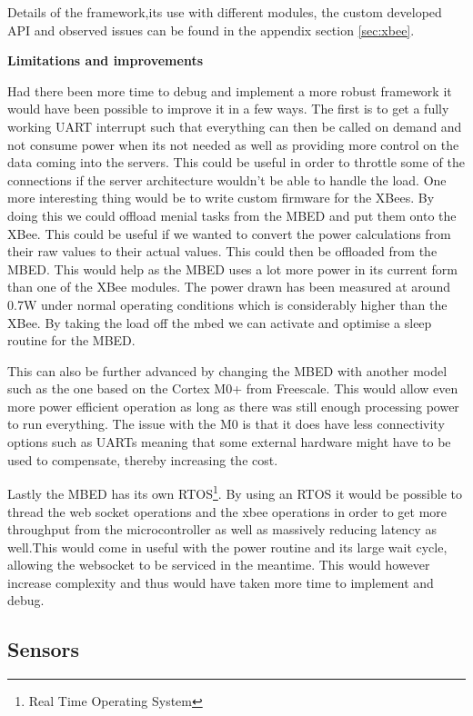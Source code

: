 \documentclass[10.5pt,a4paper,twoside]{report}   %
\begin{document}
Details of the framework,its use with different modules, the custom developed API and observed issues can be found in the appendix section \ref{sec:xbee}.

\textbf{Limitations and improvements}

Had there been more time to debug and implement a more robust framework it would have been possible to improve it in a few ways. The first is to get a fully working UART interrupt such that everything can then be called on demand and not consume power when its not needed as well as providing more control on the data coming into the servers. This could be useful in order to throttle some of the connections if the server architecture wouldn't be able to handle the load. 
One more interesting thing would be to write custom firmware for the XBees. By doing this we could offload menial tasks from the MBED and put them onto the XBee. This could be useful if we wanted to convert the power calculations from their raw values to their actual values. This could then be offloaded from the MBED. This would help as the MBED uses a lot more power in its current form than one of the XBee modules. The power drawn has been measured at around 0.7W under normal operating conditions which is considerably higher than the XBee. By taking the load off the mbed we can activate and optimise a sleep routine for the MBED.

This can also be further advanced by changing the MBED with another model such as the one based on the Cortex M0+ from Freescale. This would allow even more power efficient operation as long as there was still enough processing power to run everything. The issue with the M0 is that it does have less connectivity options such as UARTs meaning that some external hardware might have to be used to compensate, thereby increasing the cost.

Lastly the MBED has its own RTOS\footnote{Real Time Operating System}. By using an RTOS it would be possible to thread the web socket operations and the xbee operations in order to get more throughput from the microcontroller as well as massively reducing latency as well.This would come in useful with the power routine and its large wait cycle, allowing  the websocket to be serviced in the meantime. This would however increase complexity and thus would have taken more time to implement and debug. 

\subsection{Sensors}
\label{sec:sensors}
\end{document}
